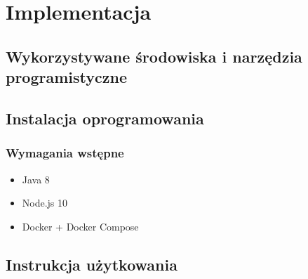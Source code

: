 \chapter{Implementacja}
\section{Wykorzystywane środowiska i narzędzia programistyczne}
\section{Instalacja oprogramowania}
\subsection{Wymagania wstępne}
\begin{itemize}
    \item Java 8 \cite{java}
    \item Node.js 10 \cite{nodejs}
    \item Docker + Docker Compose
\end{itemize}
\section{Instrukcja użytkowania}

\thispagestyle{normal}
